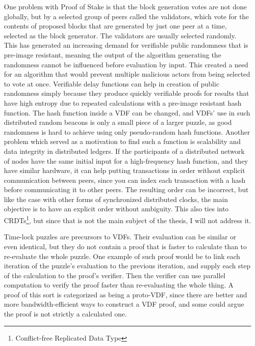 One problem with Proof of Stake is that the block generation votes are not done globally, but by a selected group of peers called the validators, which vote for the contents of proposed blocks that are generated by just one peer at a time, selected as the block generator. The validators are usually selected randomly. This has generated an increasing demand for verifiable public randomness that is pre-image resistant, meaning the output of the algorithm generating the randomness cannot be influenced before evaluation by input. This created a need for an algorithm that would prevent multiple malicious actors from being selected to vote at once. Verifiable delay functions can help in creation of public randomness simply because they produce quickly verifiable proofs for results that have high entropy due to repeated calculations with a pre-image resistant hash function. The hash function inside a VDF can be changed, and VDFs' use in such distributed random beacons is only a small piece of a larger puzzle, as good randomness is hard to achieve using only pseudo-random hash functions. Another problem which served as a motivation to find such a function is scalability and data integrity in distributed ledgers. If the participants of a distributed network of nodes have the same initial input for a high-frequency hash function, and they have similar hardware, it can help putting transactions in order without explicit communication between peers, since you can index each transaction with a hash before communicating it to other peers. The resulting order can be incorrect, but like the case with other forms of synchronized distributed clocks, the main objective is to have an explicit order without ambiguity. This also ties into CRDTs\footnote{Conflict-free Replicated Data Type}, but since that is not the main subject of the thesis, I will not address it.

Time-lock puzzles are precursors to VDFs. Their evaluation can be similar or even identical, but they do not contain a proof that is faster to calculate than to re-evaluate the whole puzzle. One example of such proof would be to link each iteration of the puzzle's evaluation to the previous iteration, and supply each step of the calculation to the proof's verifier. Then the verifier can use parallel computation to verify the proof faster than re-evaluating the whole thing. A proof of this sort is categorized as being a proto-VDF, since there are better and more bandwidth-efficient ways to construct a VDF proof, and some could argue the proof is not strictly a calculated one.

